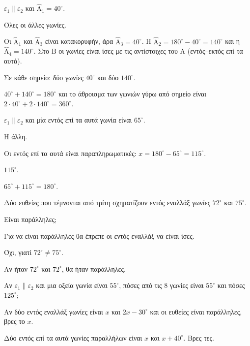 
\tixero $\varepsilon_1\parallel\varepsilon_2$ και $\hat{\mathrm{Α}}_1=40^\circ$.\par
\tithelo Όλες οι άλλες γωνίες.\par
\possindeo Οι $\hat{\mathrm{Α}}_1$ και $\hat{\mathrm{Α}}_3$ είναι κατακορυφήν, άρα $\hat{\mathrm{Α}}_3=40^\circ$. Η $\hat{\mathrm{Α}}_2=180^\circ-40^\circ=140^\circ$ και η $\hat{\mathrm{Α}}_4=140^\circ$. Στο $\mathrm{Β}$ οι γωνίες είναι ίσες με τις αντίστοιχες του $\mathrm{Α}$ (εντός--εκτός επί τα αυτά).\par
\apantisi Σε κάθε σημείο: δύο γωνίες $40^\circ$ και δύο $140^\circ$.\par
\elegxos $40^\circ+140^\circ=180^\circ$ και το άθροισμα των γωνιών γύρω από σημείο είναι $2\cdot40^\circ+2\cdot140^\circ=360^\circ$.

\tixero $\varepsilon_1\parallel\varepsilon_2$ και μία εντός επί τα αυτά γωνία είναι $65^\circ$.\par
\tithelo Η άλλη.\par
\possindeo Οι εντός επί τα αυτά είναι παραπληρωματικές: $x=180^\circ-65^\circ=115^\circ$.\par
\apantisi $115^\circ$.\par
\elegxos $65^\circ+115^\circ=180^\circ$.

\tixero Δύο ευθείες που τέμνονται από τρίτη σχηματίζουν εντός εναλλάξ γωνίες $72^\circ$ και $75^\circ$.\par
\tithelo Είναι παράλληλες;\par
\possindeo Για να είναι παράλληλες θα έπρεπε οι εντός εναλλάξ να είναι ίσες.\par
\apantisi Όχι, γιατί $72^\circ\neq75^\circ$.\par
\elegxos Αν ήταν $72^\circ$ και $72^\circ$, θα ήταν παράλληλες.



\ex Αν $\varepsilon_1\parallel\varepsilon_2$ και μια οξεία γωνία είναι $55^\circ$, πόσες από τις $8$ γωνίες είναι $55^\circ$ και πόσες $125^\circ$;

\ex Αν δύο εντός εναλλάξ γωνίες είναι $x$ και $2x-30^\circ$ και οι ευθείες είναι παράλληλες, βρες το $x$.

\ex Δύο εντός επί τα αυτά γωνίες παραλλήλων είναι $x$ και $x+40^\circ$. Βρες τες.

